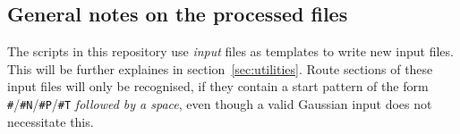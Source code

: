 \documentclass[   %
  final,          %
  a4paper         %
]{article}
\begin{document}
\subsection{General notes on the processed files}

The scripts in this repository use \emph{input} files as templates to write new input files.
This will be further explaines in section~\ref{sec:utilities}.
Route sections of these input files will only be recognised, 
if they contain a start pattern of the form \texttt{\#}/\texttt{\#N}/\texttt{\#P}/\texttt{\#T}
\emph{followed by a space}, even though a valid Gaussian input does not necessitate this.
\end{document}
